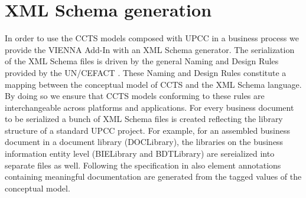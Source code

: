 \documentclass{acm_proc_article-sp}
\begin{document}
%

\section{XML Schema generation}
In order to use the CCTS models composed with UPCC in a business process we provide the VIENNA Add-In with an XML Schema generator.  The serialization of the XML Schema files is driven by the general Naming and Design Rules provided by the UN/CEFACT \cite{CEFACT:NDR}. These Naming and Design Rules constitute a mapping between the conceptual model of CCTS and the XML Schema language. By doing so we ensure that CCTS models conforming to these rules are interchangeable across platforms and applications. For every business document to be serialized a bunch of XML Schema files is created reflecting the library structure of a standard UPCC project. For example, for an assembled business document in a document library (DOCLibrary), the libraries on the business information entity level (BIELibrary and BDTLibrary) are sereialized into separate files as well. Following the specification in \cite{CEFACT:NDR} also element annotations containing meaningful documentation are generated from the tagged values of the conceptual model. 
\end{document}
